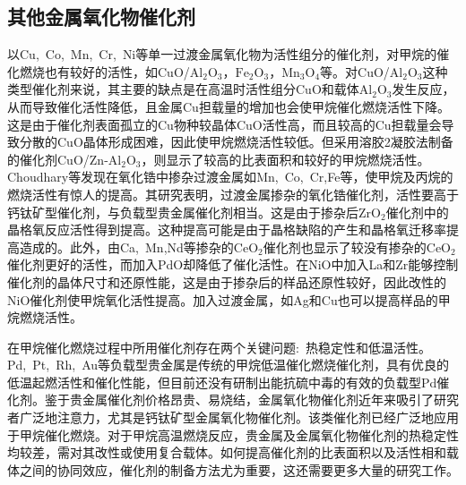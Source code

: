 \subsection{其他金属氧化物催化剂}
以\textrm{Cu},~\textrm{Co},~\textrm{Mn},~\textrm{Cr},~\textrm{Ni}等单一过渡金属氧化物为活性组分的催化剂，对甲烷的催化燃烧也有较好的活性，如\textrm{CuO}/$\mathrm{Al}_2\mathrm{O}_3$，$\mathrm{Fe}_2\mathrm{O}_3$，$\mathrm{Mn}_3\mathrm{O}_4$等。对\textrm{CuO}/$\mathrm{Al}_2\mathrm{O}_3$这种类型催化剂来说，其主要的缺点是在高温时活性组分\textrm{CuO}和载体$\mathrm{Al}_2\mathrm{O}_3$发生反应，从而导致催化活性降低，且金属\textrm{Cu}担载量的增加也会使甲烷催化燃烧活性下降。这是由于催化剂表面孤立的\textrm{Cu}物种较晶体\textrm{CuO}活性高，而且较高的\textrm{Cu}担载量会导致分散的\textrm{CuO}晶体形成困难，因此使甲烷燃烧活性较低。但采用溶胶2凝胶法制备的催化剂\textrm{CuO}/\textrm{Zn}-$\mathrm{Al}_2\mathrm{O}_3$，则显示了较高的比表面积和较好的甲烷燃烧活性。\textrm{Choudhary}等发现在氧化锆中掺杂过渡金属如\textrm{Mn},~\textrm{Co},~\textrm{Cr},\textrm{Fe}等，使甲烷及丙烷的燃烧活性有惊人的提高。其研究表明，过渡金属掺杂的氧化锆催化剂，活性要高于钙钛矿型催化剂，与负载型贵金属催化剂相当。这是由于掺杂后$\mathrm{ZrO}_2$催化剂中的晶格氧反应活性得到提高。这种提高可能是由于晶格\cite{ACA253-65_2003}缺陷的产生和晶格氧迁移率提高造成的。此外，由\textrm{Ca},~\textrm{Mn},\textrm{Nd}等掺杂的$\mathrm{CeO}_2$催化剂也显示了较没有掺杂的$\mathrm{CeO}_2$催化剂更好的活性，而加入\textrm{PdO}却降低了催化活性。在\textrm{NiO}中加入\textrm{La}和\textrm{Zr}能够控制催化剂的晶体尺寸和还原性能，这是由于掺杂后的样品还原性较好，因此改性的\textrm{NiO}催化剂使甲烷氧化活性提高。加入过渡金属，如\textrm{Ag}和\textrm{Cu}也可以提高样品的甲烷燃烧活性。

在甲烷催化燃烧过程中所用催化剂存在两个关键问题:~热稳定性和低温活性。\textrm{Pd},~\textrm{Pt},~\textrm{Rh},~\textrm{Au}等负载型贵金属是传统的甲烷低温催化燃烧催化剂，具有优良的低温起燃活性和催化性能，但目前还没有研制出能抗硫中毒的有效的负载型Pd催化剂。鉴于贵金属催化剂价格昂贵、易烧结，金属氧化物催化剂近年来吸引了研究者广泛地注意力，尤其是钙钛矿型金属氧化物催化剂。该类催化剂已经广泛地应用于甲烷催化燃烧。对于甲烷高温燃烧反应，贵金属及金属氧化物催化剂的热稳定性均较差，需对其改性或使用复合载体。如何提高催化剂的比表面积以及活性相和载体之间的协同效应，催化剂的制备方法尤为重要，这还需要更多大量的研究工作。
